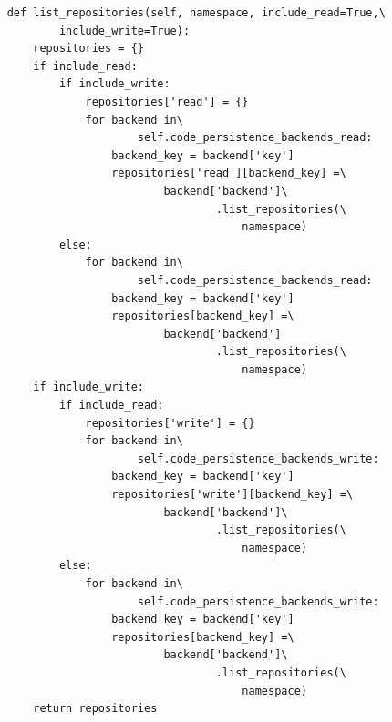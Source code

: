 \begin{lstlisting}
    def list_repositories(self, namespace, include_read=True,\
            include_write=True):
        repositories = {}
        if include_read:
            if include_write:
                repositories['read'] = {}
                for backend in\
                        self.code_persistence_backends_read:
                    backend_key = backend['key']
                    repositories['read'][backend_key] =\
                            backend['backend']\
                                    .list_repositories(\
                                        namespace)
            else:
                for backend in\
                        self.code_persistence_backends_read:
                    backend_key = backend['key']
                    repositories[backend_key] =\
                            backend['backend']
                                    .list_repositories(\
                                        namespace)
        if include_write:
            if include_read:
                repositories['write'] = {}
                for backend in\
                        self.code_persistence_backends_write:
                    backend_key = backend['key']
                    repositories['write'][backend_key] =\
                            backend['backend']\
                                    .list_repositories(\
                                        namespace)
            else:
                for backend in\
                        self.code_persistence_backends_write:
                    backend_key = backend['key']
                    repositories[backend_key] =\
                            backend['backend']\
                                    .list_repositories(\
                                        namespace)
        return repositories


\end{lstlisting}
